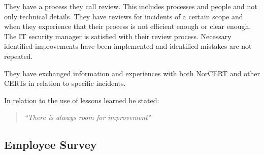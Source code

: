 They have a process they call review. This includes processes and people and not only technical details. They have reviews for incidents of a certain scope and when they experience that their process is not efficient enough or clear enough. The IT security manager is satisfied with their review process. Necessary identified improvements have been implemented and identified mistakes are not repeated.

They have exchanged information and experiences with both \acs{NorCERT} and other \acp{CERT} in relation to specific incidents.

In relation to the use of lessons learned he stated: 

\begin{quote}
\textit{``There is always room for improvement"}
\end{quote}

\subsection{Employee Survey}
